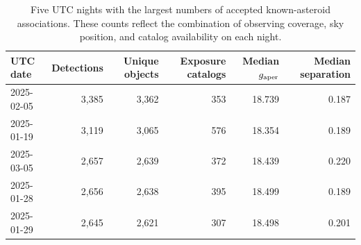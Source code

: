 \begin{table}[!htbp]
\centering
\caption{Five UTC nights with the largest numbers of accepted known-asteroid associations. These counts reflect the combination of observing coverage, sky position, and catalog availability on each night.}
\label{tab:nightly_top5}
\footnotesize
\setlength{\tabcolsep}{6pt}
\renewcommand{\arraystretch}{1.12}
\begin{tabular}{lrrrrr}
\toprule
UTC date & Detections & Unique objects & Exposure catalogs & Median $g_{\rm aper}$ & Median separation \\
\midrule
2025-02-05 & 3,385 & 3,362 & 353 & 18.739 & 0.187 \\
2025-01-19 & 3,119 & 3,065 & 576 & 18.354 & 0.189 \\
2025-03-05 & 2,657 & 2,639 & 372 & 18.439 & 0.220 \\
2025-01-28 & 2,656 & 2,638 & 395 & 18.499 & 0.189 \\
2025-01-29 & 2,645 & 2,621 & 307 & 18.498 & 0.201 \\
\bottomrule
\end{tabular}
\end{table}

